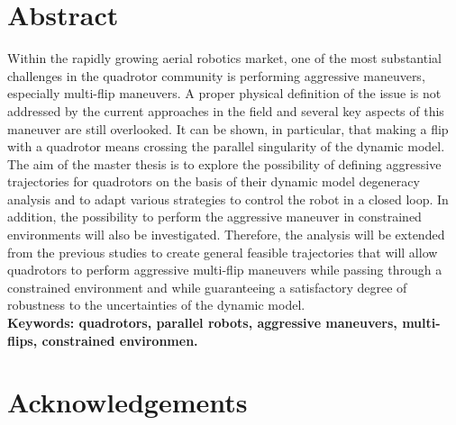 \documentclass{thesisreport}
\begin{document}
   
 
  \section*{Abstract}
Within the rapidly growing aerial robotics market, one of the most substantial challenges in the quadrotor community is performing aggressive maneuvers, especially multi-flip maneuvers.  A proper physical definition of the issue is not addressed by the current approaches in the field and several key aspects of this maneuver are still overlooked.
It can be shown, in particular, that making a flip with a quadrotor means crossing the parallel singularity of the dynamic model. The aim of the master thesis is to explore the possibility of defining aggressive trajectories for quadrotors on the basis of their dynamic model degeneracy analysis and to adapt various strategies to control the robot in a closed loop. In addition, the possibility to perform the aggressive maneuver in constrained environments will also be investigated.
Therefore, the analysis will be extended from the previous studies to create general feasible trajectories that will allow quadrotors to perform aggressive multi-flip maneuvers while passing through a constrained environment and while guaranteeing a satisfactory degree of robustness to the uncertainties of the dynamic model.\\

\textbf{Keywords: quadrotors, parallel robots, aggressive maneuvers, multi-flips, constrained environmen. } 
 
 \newpage
 
 \section*{Acknowledgements}
\end{document}
